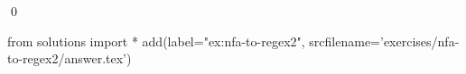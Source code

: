 
\begin{ex} 
  \label{ex:nfa-to-regex2}
  
  \qed
\end{ex} 
\begin{python0}
from solutions import *
add(label="ex:nfa-to-regex2",
    srcfilename='exercises/nfa-to-regex2/answer.tex') 
\end{python0}
